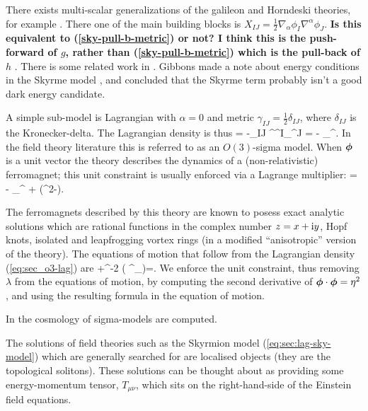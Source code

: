 There exists multi-scalar generalizations of the galileon and Horndeski theories, for example \cite{Deffayet:2010zh, Padilla:2010de, Hinterbichler:2010xn, Padilla:2012dx}. There one of the main building blocks is $X_{IJ}  = \tfrac{1}{2}\nabla_{\alpha}\phi_I \nabla^{\alpha}\phi_J$. \textbf{Is this equivalent to (\ref{sky-pull-b-metric}) or not? I think this is the push-forward of $g$, rather than (\ref{sky-pull-b-metric}) which is the pull-back of $h$ }. There is some related work in \cite{Padilla:2010ir}. Gibbons made a note about energy conditions in the Skyrme model \cite{Gibbons:2003cp}, and concluded that the Skyrme term probably isn't a good dark energy candidate.

A simple sub-model is Lagrangian with $\alpha=0$ and metric $\gamma_{IJ} =  \tfrac{1}{2}\delta_{IJ}$, where $\delta_{IJ}$ is the Kronecker-delta. The Lagrangian density is thus
\bea
\ld = -\delta_{IJ} \partial^{\mu}\phi^I\partial_{\mu}\phi^J = - \partial_{\mu}\gbm{\phi}\cdot\partial^{\mu}\gbm{\phi}.
\eea
In the field theory literature this is referred to as an $O(3)$-sigma model. When $\bm{\phi}$ is a unit vector the theory describes the dynamics of a (non-relativistic) ferromagnet; this unit constraint is usually enforced via a Lagrange multiplier:
\bea
\label{eq:sec_o3-lag}
\ld =  - \partial_{\mu}\gbm{\phi}\cdot\partial^{\mu}\gbm{\phi} + \lambda\left(\eta^2-\gbm{\phi}\cdot\gbm{\phi}\right).
\eea

The ferromagnets described by this theory are known to posess exact analytic solutions which are rational functions in the complex number $z = x + \textrm{i} y$, Hopf knots,  isolated and leapfrogging vortex rings (in a modified ``anisotropic'' version of the theory). The equations of motion that follow from the Lagrangian density (\ref{eq:sec_o3-lag}) are
\bea
\square\gbm{\phi} +\eta^{-2} \left( \nabla^{\mu}\gbm{\phi}\cdot\nabla_{\mu}\gbm{\phi}\right)\gbm{\phi}=.
\eea
We enforce the unit constraint, thus removing $\lambda$ from the equations of motion, by computing the second derivative of $\bm{\phi}\cdot\bm{\phi}=\eta^2$, and using the resulting formula in the equation of motion. 

In \cite{Shchigolev:2013gfa} the cosmology of sigma-models are computed.

The solutions of field theories such as the Skyrmion model (\ref{eq:sec:lag-sky-model}) which are generally searched for are  localised objects (they are the topological solitons). These solutions can be thought about as providing some energy-momentum tensor, $T_{\mu\nu}$, which sits on the right-hand-side of the Einstein field equations.

